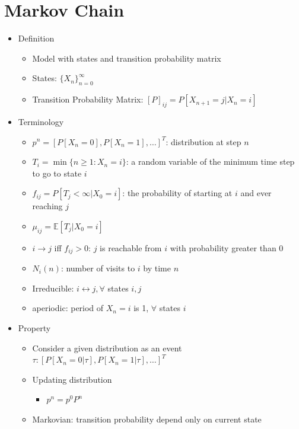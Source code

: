 \documentclass[a4paper]{article}
\begin{document}
\section{Markov Chain}
\begin{itemize}
    \item Definition
        \begin{itemize}
            \item Model with states and transition probability matrix
            \item States: $\{X_n\}_{n=0}^\infty$
            \item Transition Probability Matrix: $[P]_{ij} = P[X_{n+1} = j|X_n = i]$
        \end{itemize}
    \item Terminology
        \begin{itemize}
            \item $p^n = [P[X_n = 0], P[X_n = 1], \dots]^T$: distribution at step $n$
            \item $T_i = \min\{n \geq 1: X_n = i\}$: a random variable of the minimum time step to go to state $i$
            \item $f_{ij} = P[T_j < \infty | X_0 = i]$: the probability of starting at $i$ and ever reaching $j$
            \item $\mu_{ij} = \mathbb{E}[T_j | X_0 = i]$
            \item $i \rightarrow j$ iff $f_{ij} > 0$: $j$ is reachable from $i$ with probability greater than 0
            \item $N_i(n)$: number of visits to $i$ by time $n$
            \item Irreducible: $i \leftrightarrow j, \forall$ states $i, j$
            \item aperiodic: period of $X_n = i$ is 1, $\forall$ states $i$
        \end{itemize}
    \item Property
        \begin{itemize}
            \item Consider a given distribution as an event $\tau: [P[X_n = 0| \tau], P[X_n = 1| \tau], \dots]^T$
            \item Updating distribution
                \begin{itemize}
                    \item $p^n = p^0 P^n$
                \end{itemize}
            \item Markovian: transition probability depend only on current state

\end{itemize}
\end{itemize}
\end{document}
